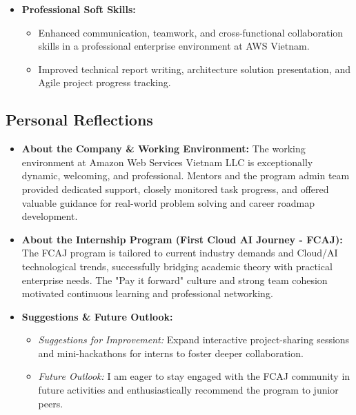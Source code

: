 \documentclass[a4paper]{article}
\begin{document}
\begin{itemize}
    \item \textbf{Professional Soft Skills:}
    \begin{itemize}
        \item Enhanced communication, teamwork, and cross-functional collaboration skills in a professional enterprise environment at AWS Vietnam.
        \item Improved technical report writing, architecture solution presentation, and Agile project progress tracking.
    \end{itemize}
\end{itemize}

\subsection{Personal Reflections}

\begin{itemize}
    \item \textbf{About the Company \& Working Environment:}
    The working environment at Amazon Web Services Vietnam LLC is exceptionally dynamic, welcoming, and professional. Mentors and the program admin team provided dedicated support, closely monitored task progress, and offered valuable guidance for real-world problem solving and career roadmap development.

    \item \textbf{About the Internship Program (First Cloud AI Journey - FCAJ):}
    The FCAJ program is tailored to current industry demands and Cloud/AI technological trends, successfully bridging academic theory with practical enterprise needs. The "Pay it forward" culture and strong team cohesion motivated continuous learning and professional networking.

    \item \textbf{Suggestions \& Future Outlook:}
    \begin{itemize}
        \item \textit{Suggestions for Improvement:} Expand interactive project-sharing sessions and mini-hackathons for interns to foster deeper collaboration.
        \item \textit{Future Outlook:} I am eager to stay engaged with the FCAJ community in future activities and enthusiastically recommend the program to junior peers.
    \end{itemize}
\end{itemize}


\end{document}

